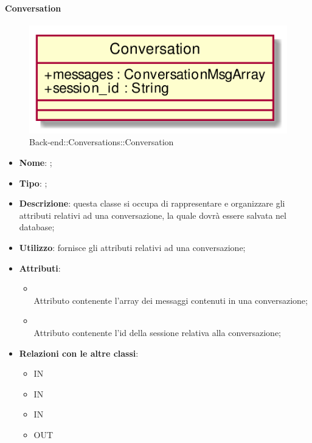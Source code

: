 \hypertarget{Conversation_label}{\paragraph{Conversation}}
\begin{figure}[h]
	\centering
	\includegraphics[width=\textwidth,height=\textheight,keepaspectratio]{images/ClassConversation.png}
	\caption{Back-end::Conversations::Conversation}
\end{figure}
\begin{itemize}
	\item \textbf{Nome}: ;
	\item \textbf{Tipo}: ;
	\item \textbf{Descrizione}: questa classe si occupa di rappresentare e organizzare gli attributi relativi ad una conversazione, la quale dovrà essere salvata nel database;
	\item \textbf{Utilizzo}: fornisce gli attributi relativi ad una conversazione;
	\item \textbf{Attributi}:
	\begin{itemize}
		\item[]  \\
		Attributo contenente l'array dei messaggi contenuti in una conversazione;
		\item[]  \\
		Attributo contenente l'id della sessione relativa alla conversazione;
	\end{itemize}
	\item \textbf{Relazioni con le altre classi}:
	\begin{itemize}
		\item IN \hyperlink{<<interface>> ConversationsDAO_label}{}
		\item IN \hyperlink{ConversationObserver_label}{}
		\item IN \hyperlink{ConversationsDAODynamoDB_label}{}
		\item OUT \hyperlink{ConversationMsg_label}{}
	\end{itemize}
\end{itemize}
\FloatBarrier

